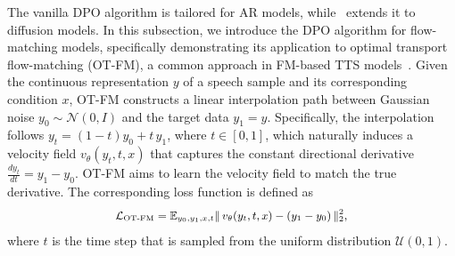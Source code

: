 \documentclass[11pt]{article}
\begin{document}
The vanilla DPO algorithm is tailored for AR models, while~\citet{wallace2024diffusion} extends it to diffusion models. In this subsection, we introduce the DPO algorithm for flow-matching models, specifically demonstrating its application to optimal transport flow-matching (OT-FM), a common approach in FM-based TTS models~\cite{voicebox,e2tts,f5tts}.
Given the continuous representation $y$ of a speech sample and its corresponding condition $x$, OT-FM constructs a linear interpolation path between Gaussian noise $y_0 \sim \mathcal{N}(0, I)$ and the target data $y_1 = y$. Specifically, the interpolation follows $y_t = (1-t)y_0 + t\,y_1$, where $t \in [0,1]$,
which naturally induces a velocity field \( v_\theta(y_t, t, x) \) that captures the constant directional derivative
$\frac{dy_t}{dt} = y_1 - y_0$.
OT-FM aims to learn the velocity field to match the true derivative. The corresponding loss function is defined as
\begin{equation}
{\small
\begin{aligned}
\mathcal{L}_{\text{OT-FM}} = \mathbb{E}_{y_0, y_1, x, t}
\|\,v_\theta(y_t,t,x) - \left(y_1 - y_0\right)\|_2^2,
\end{aligned}
}
\label{eq:obj_fm}
\end{equation}
where $t$ is the time step that is sampled from the uniform distribution $\mathcal{U}(0, 1)$.
\end{document}
